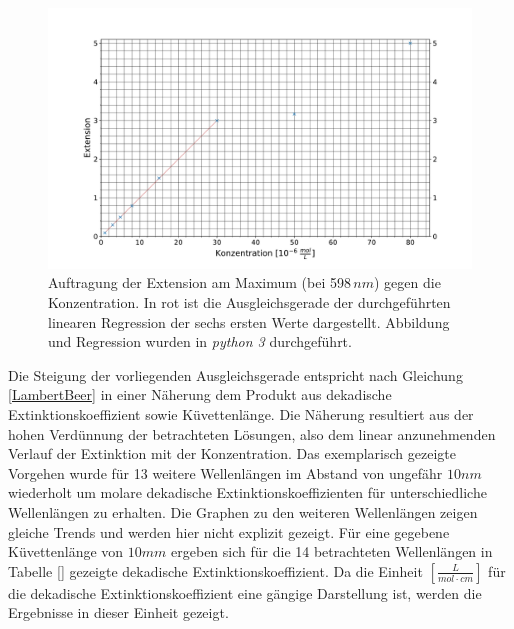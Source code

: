\begin{figure}[H]
	\centering	
	\begin{minipage}{1\textwidth}
		\includegraphics[width=\columnwidth]{Rohdaten/KonzgegenExt.pdf}	
		\caption{Auftragung der Extension am Maximum (bei 598$\,\si{nm}$) gegen die Konzentration. In rot ist die Ausgleichsgerade der durchgeführten linearen Regression der sechs ersten Werte dargestellt. Abbildung und Regression wurden in \textit{python 3} durchgeführt.}
		\label{fig:KonzgegenExt}
	\end{minipage}
	
\end{figure}
Die Steigung der vorliegenden Ausgleichsgerade entspricht nach Gleichung \ref{LambertBeer} in einer Näherung dem Produkt aus dekadische Extinktionskoeffizient sowie Küvettenlänge. Die Näherung resultiert aus der hohen Verdünnung der betrachteten Lösungen, also dem linear anzunehmenden Verlauf der Extinktion mit der Konzentration. Das exemplarisch gezeigte Vorgehen wurde für 13 weitere Wellenlängen im Abstand von ungefähr $10 \si{nm}$ wiederholt um molare dekadische Extinktionskoeffizienten für unterschiedliche Wellenlängen zu erhalten. Die Graphen zu den weiteren Wellenlängen zeigen gleiche Trends und werden hier nicht explizit gezeigt. Für eine gegebene Küvettenlänge von $10\si{mm}$ ergeben sich für die 14 betrachteten Wellenlängen in Tabelle \ref{} gezeigte dekadische Extinktionskoeffizient. Da die Einheit $\left[ \si{\frac{L}{mol\cdot cm}}\right]$ für die dekadische Extinktionskoeffizient eine gängige Darstellung ist, werden die Ergebnisse in dieser Einheit gezeigt.

